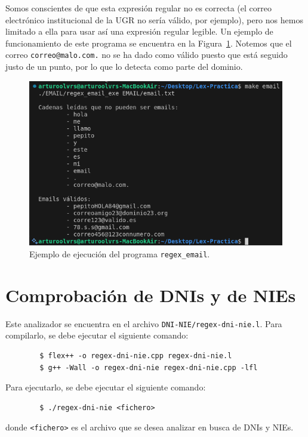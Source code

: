 \documentclass[12pt]{article}
\begin{document}
    Somos conscientes de que esta expresión regular no es correcta (el correo electrónico institucional de la UGR no sería válido, por ejemplo), pero nos hemos limitado a ella para usar así una expresión regular legible. Un ejemplo de funcionamiento de este programa se encuentra en la Figura~\ref{fig:email}. Notemos que el correo \verb|correo@malo.com.| no se ha dado como válido puesto que está seguido justo de un punto, por lo que lo detecta como parte del dominio.
    \begin{figure}
        \centering
        \includegraphics[width=\textwidth]{Img/Funcionamiento_Email.png}
        \caption{Ejemplo de ejecución del programa \texttt{regex\_email}.}
        \label{fig:email}
    \end{figure}

    \section{Comprobación de DNIs y de NIEs}

    Este analizador se encuentra en el archivo \verb|DNI-NIE/regex-dni-nie.l|. Para compilarlo, se debe ejecutar el siguiente comando:
    \begin{verbatim}
        $ flex++ -o regex-dni-nie.cpp regex-dni-nie.l
        $ g++ -Wall -o regex-dni-nie regex-dni-nie.cpp -lfl
    \end{verbatim}

    Para ejecutarlo, se debe ejecutar el siguiente comando:
    \begin{verbatim}
        $ ./regex-dni-nie <fichero>
    \end{verbatim}
    donde \verb|<fichero>| es el archivo que se desea analizar en busca de DNIs y NIEs.
\end{document}
